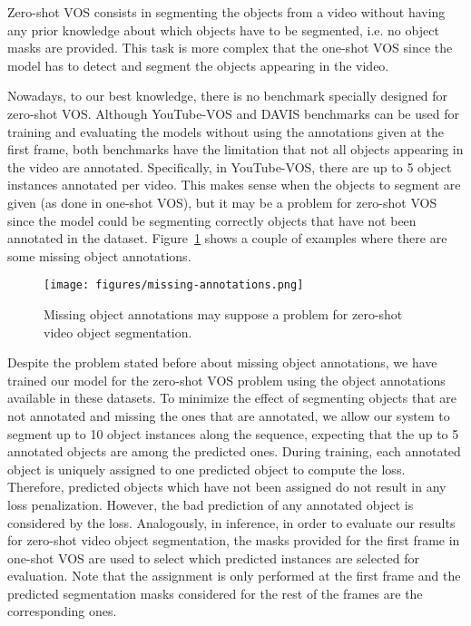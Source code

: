 \documentclass[10pt,twocolumn,letterpaper]{article}
\begin{document}
Zero-shot VOS consists in segmenting the objects from a video without having any prior knowledge about which objects have to be segmented, i.e. no object masks are provided. This task is more complex that the one-shot VOS since the model has to detect and segment the objects appearing in the video. 

Nowadays, to our best knowledge, there is no benchmark specially designed for zero-shot VOS. Although YouTube-VOS and DAVIS benchmarks can be used for training and evaluating the models without using the annotations given at the first frame, both benchmarks have the limitation that not all objects appearing in the video are annotated. Specifically, in YouTube-VOS, there are up to 5 object instances annotated per video. This makes sense when the objects to segment are given (as done in one-shot VOS), but it may be a problem for zero-shot VOS since the model could be segmenting correctly objects that have not been annotated in the dataset. Figure~\ref{fig:missing-annotations} shows a couple of examples where there are some missing object annotations. 

\begin{figure}
    \centering
    \texttt{[image: figures/missing-annotations.png]}
    \caption{Missing object annotations may suppose a problem for zero-shot video object segmentation. }
    \label{fig:missing-annotations}
\end{figure}

Despite the problem stated before about missing object annotations, we have trained our model for the zero-shot VOS problem using the object annotations available in these datasets. To minimize the effect of segmenting objects that are not annotated and missing the ones that are annotated, we allow our system to segment up to 10 object instances along the sequence, expecting that the up to 5 annotated objects are among the predicted ones. During training, each annotated object is uniquely assigned to one predicted object to compute the loss. Therefore, predicted objects which have not been assigned do not result in any loss penalization. However, the bad prediction of any annotated object is considered by the loss. Analogously, in inference, in order to evaluate our results for zero-shot video object segmentation, the masks provided for the first frame in one-shot VOS are used to select which predicted instances are selected for evaluation. Note that the assignment is only performed at the first frame and the predicted segmentation masks considered for the rest of the frames are the corresponding ones. 
\end{document}
